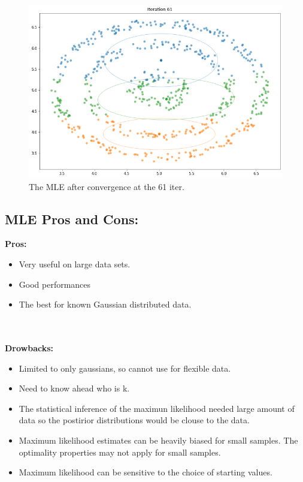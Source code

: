 \documentclass[12pt, a4paper]{paper}
\begin{document}
\begin{figure}[h!]
\centering
\includegraphics[scale=0.3]{MLE_cir_iter_61.png}
\caption{The MLE after convergence at the 61 iter.}
\label{fig:Circular_3}
\end{figure}

\newpage
\subsection*{MLE Pros and Cons:}

\textbf{Pros:}
\begin{itemize}
    \item Very useful on large data sets.
    \item Good performances 
    \item The best for known Gaussian distributed data. 
\end{itemize} 
\\\\
\textbf{Drowbacks:}
\begin{itemize}
    \item Limited to only gaussians, so cannot use for flexible data.
    \item Need to know ahead who is k.
    \item The statistical inference of the maximun likelihood needed large amount of data so the postirior distributions would be clouse to the data. 
    \item Maximum likelihood estimates can be heavily biased for small samples. The optimality properties may not apply for small samples.
    \item Maximum likelihood can be sensitive to the choice of starting values.
\end{itemize}
\end{document}
